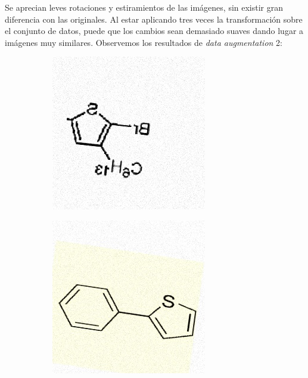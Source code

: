 Se aprecian leves rotaciones y estiramientos de las imágenes, sin existir gran diferencia con las originales. Al estar aplicando tres veces la transformación sobre el conjunto de datos, puede que los cambios sean demasiado suaves dando lugar a imágenes muy similares. Observemos los resultados de \textit{data augmentation} 2:

\begin{figure}[H]
\centering
    \begin{subfigure}{.23\textwidth}
        \centering
        \includegraphics[width=1\linewidth]{imagenes/aug2/169.jpg}
    \end{subfigure}%
    \begin{subfigure}{.23\textwidth}
        \centering
        \includegraphics[width=1\linewidth]{imagenes/aug2/188.jpg}
    \end{subfigure}%


\end{figure}
